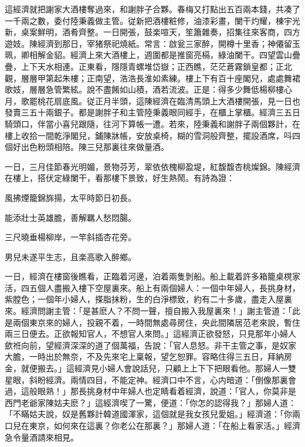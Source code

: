 這經濟就把謝家大酒樓奪過來，和謝胖子合夥。春梅又打點出五百兩本錢，共凑了一千兩之數，委付陸秉義做主管。従新把酒樓粧修，油漆彩畫，闌干灼耀，棟宇光新，桌案鮮明，酒肴齊整。一日開張，鼓楽喧天，笙簫雜奏，招集往來客商，四方遊妓。陳經濟到那日，宰猪祭祀燒紙。常言：啟瓮三家醉，開樽十里香；神僊留玉珮，卿相解金貂。經濟上來大酒樓上，週圍都是推窗亮槅，綠油闌干。四望雲山疊疊，上下天水相連。正東看，隱隱青螺堆岱嶽；正西瞧，茫茫蒼霧鎖皇都；正北觀，層層甲第起朱樓；正南望，浩浩長淮如素練。樓上下有百十座閣兒，處處舞裙歌妓，層層急管繁絃。說不盡餚如山積，酒若流波。正是：得多少舞低楊柳樓心月，歌罷桃花扇底風。従正月半頭，這陳經濟在臨清馬頭上大酒樓開張，見一日也發賣三五十兩銀子。都是謝胖子和主管陸秉義眼同經手，在櫃上掌櫃。經濟三五日騎頭口，伴當小喜兒跟隨，往河下算帳一遭。若來，陸秉義和謝胖子兩個夥計，在樓上收拾一間乾淨閣兒，鋪陳牀帳，安放桌椅，糊的雪洞般齊整，擺設酒席，呌四個好出色粉頭相陪。陳三兒那裏往來做量酒。

一日，三月佳節春光明媚，景物芬芳，翠依依槐柳盈堤，紅馥馥杏桃燦錦。陳經濟在樓上，搭伏定綠闌干，看那樓下景致，好生熱鬧。有詩為證：

風拂煙籠錦旆揚，太平時節日初長。

能添壯士英雄膽，善解羈人愁悶腸。

三尺曉垂楊柳岸，一竿斜插杏花旁。

男兒未遂平生志，且楽高歌入醉鄉。

一日，經濟在樓窗後瞧看，正臨着河邊，泊着兩隻剝船。船上載着許多箱籠桌櫈家活，四五個人盡搬入樓下空屋裏來。船上有兩個婦人：一個中年婦人，長挑身材，紫膛色；一個年小婦人，搽脂抹粉，生的白淨標致，約有二十多歲，盡走入屋裏來。經濟問謝主管：「是甚麽人？不問一聲，擅自搬入我屋裏來！」謝主管道：「此是兩個東京來的婦人，投親不着，一時間無處尋房住，央此間隣居范老來說，暫住兩三日便去。正欲報知官人，不想官人來問。」這經濟正欲發怒，只見那年小婦人歛袵向前，望經濟深深的道了個萬福，告說：「官人息怒。非干主管之事，是奴家大膽，一時出於無奈，不及先來宅上稟報，望乞恕罪。容略住得三五日，拜納房金，就便搬去。」這經濟見小婦人會說話兒，只顧上上下下把眼看他。那婦人一雙星眼，斜盼經濟。兩情四目，不能定神。經濟口中不言，心内暗道：「倒像那裏會過，這般眼熟！」那長挑身材中年婦人也定睛看着經濟，說道：「官人，你莫非是西門老爺家陳姑夫麽？」這經濟喫了一驚，便道：「你怎的認得我？」那婦人道：「不瞞姑夫說，奴是舊夥計韓道國渾家，這個就是我女孩兒愛姐。」經濟道：「你兩口兒在東京，如何來在這裏？你老公在那裏？」那婦人道：「在船上看家活。」經濟急令量酒請來相見。

